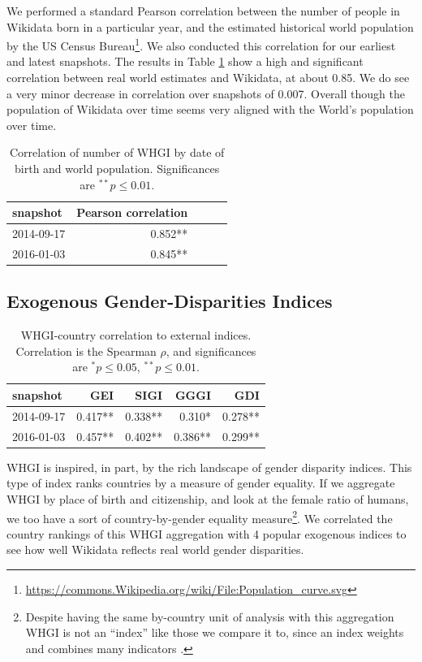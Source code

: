 \documentclass[letterpaper]{article}
\begin{document}
We performed a standard Pearson correlation between the number of people in Wikidata born in a particular year, and the estimated historical world population by the US Census
Bureau\footnote{\url{https://commons.Wikipedia.org/wiki/File:Population_curve.svg}}.
We also conducted this correlation for our earliest and latest snapshots. The results in Table \ref{table:worldpop} show a high and significant correlation between real world estimates and Wikidata, at about 0.85. We do see a very minor decrease in correlation over snapshots of 0.007. Overall though the population of Wikidata over time seems very aligned with the World's population over time.

\begin{table}
\caption{Correlation of number of WHGI by date of birth and world population. Significances are $ ^{**}p\leq 0.01$.}
\label{table:worldpop}
\begin{tabular}{lrrrr}
\toprule
snapshot &  Pearson correlation \\
\midrule
2014-09-17 & 0.852**  \\
2016-01-03 & 0.845**  \\
\bottomrule
\end{tabular}
\end{table}

\subsection{Exogenous Gender-Disparities Indices}
\begin{table}
\caption{WHGI-country correlation to external indices. Correlation is the Spearman $\rho$, and significances are $ ^*p\leq 0.05 $, $ ^{**}p\leq 0.01$.}
\label{table:scores}
\begin{tabular}{lrrrr}
\toprule
snapshot &  GEI &  SIGI &  GGGI &  GDI  \\
\midrule
2014-09-17 &  0.417** &       0.338** &          0.310* &         0.278**  \\
2016-01-03 &  0.457** &       0.402** &          0.386** &         0.299**  \\
\bottomrule
\end{tabular}
\end{table}

WHGI is inspired, in part, by the rich landscape of gender disparity indices. This type of index ranks countries by a measure of gender equality. If we aggregate WHGI by place of birth and citizenship, and look at the female ratio of humans, we too have a sort of country-by-gender equality measure\footnote{Despite having the same by-country unit of analysis with this aggregation WHGI is not an ``index'' like those we compare it to, since an index weights and combines many indicators \cite{rossi_handbook_1980}. }.  We correlated the country rankings of this WHGI aggregation with 4 popular exogenous indices to see how well Wikidata reflects real world gender disparities. 
\end{document}

